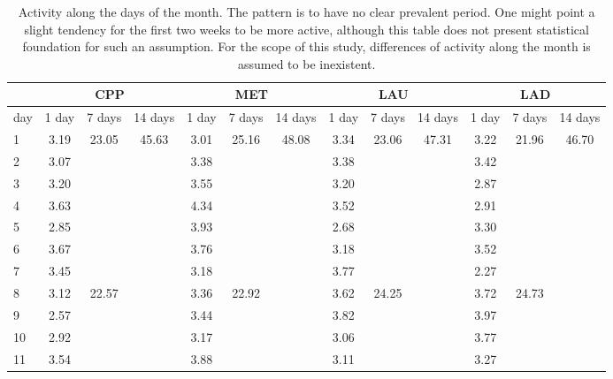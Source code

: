 \documentclass[%
 aip,
 jmp,%
 amsmath,amssymb,
 reprint,%
]{revtex4-1}
\begin{document}
\begin{table}
    \caption{Activity along the days of the month. The pattern is to have no clear prevalent period. One might point a slight tendency for the first two weeks to be more active, although this table does not present statistical foundation for such an assumption. For the scope of this study, differences of activity along the month is assumed to be inexistent.}
\begin{center}
    \begin{tabular}{ |l|| c|c|c| c|c|c| c|c|c| c|c|c|}
        \hline
    & \multicolumn{3}{c|}{CPP} & \multicolumn{3}{c|}{MET} & \multicolumn{3}{c|}{LAU} & \multicolumn{3}{c|}{LAD}  \\ \hline
day    & 1 day & 7 days & 14 days &   1 day & 7 days & 14 days &   1 day & 7 days & 14 days &   1 day & 7 days & 14 days \\ \hline\hline
1  & 3.19 & \multirow{7}{*}{23.05} & \multirow{14}{*}{45.63} & 3.01 & \multirow{7}{*}{25.16} & \multirow{14}{*}{48.08} & 3.34 & \multirow{7}{*}{23.06} &  \multirow{14}{*}{47.31} & 3.22 & \multirow{7}{*}{21.96} & \multirow{14}{*}{46.70} \\
2  & 3.07 &                        &                         & 3.38  & & &  3.38 & & & 3.42 & & \\
3  & 3.20 &                        &                         & 3.55  & & & 3.20 & & & 2.87 & & \\
4  & 3.63 &                        &                         & 4.34  & & & 3.52 & & & 2.91 & & \\
5  & 2.85 &                        &                         & 3.93  & & &  2.68 & & & 3.30 & & \\
6  & 3.67 &                        &                         & 3.76  & & & 3.18 & & & 3.52 & & \\
7  & 3.45 &                        &                         & 3.18  & & & 3.77 & & & 2.27 & & \\\cline{3-3}\cline{6-6}\cline{9-9}\cline{12-12}
8  & 3.12 & \multirow{7}{*}{22.57} &                         & 3.36  & \multirow{7}{*}{22.92} & & 3.62 & \multirow{7}{*}{24.25} & & 3.72 & \multirow{7}{*}{24.73} &  \\
9  & 2.57 &                        &                         & 3.44  & & & 3.82 & & & 3.97 & & \\
10  & 2.92 &                        &                         & 3.17  & & & 3.06 & & & 3.77 & & \\
11  & 3.54 &                        &                         & 3.88  & & & 3.11 & & & 3.27 & & \\

\end{tabular}
\end{center}
\end{table}
\end{document}
